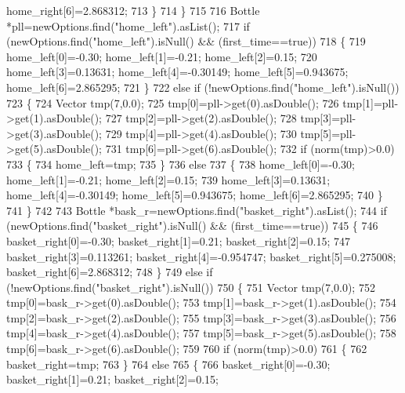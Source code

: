 \begin{DoxyCode}
      home_right[6]=2.868312;
713         \}
714     \}
715 
716     Bottle *pll=newOptions.find(\textcolor{stringliteral}{"home\_left"}).asList();
717     \textcolor{keywordflow}{if} (newOptions.find(\textcolor{stringliteral}{"home\_left"}).isNull() && (first\_time==\textcolor{keyword}{true}))
718     \{
719         home_left[0]=-0.30; home_left[1]=-0.21; home_left[2]=0.15;
720         home_left[3]=0.13631; home_left[4]=-0.30149; home_left[5]=0.943675; 
      home_left[6]=2.865295;
721     \}
722     \textcolor{keywordflow}{else} \textcolor{keywordflow}{if} (!newOptions.find(\textcolor{stringliteral}{"home\_left"}).isNull())
723     \{
724         Vector tmp(7,0.0);
725         tmp[0]=pll->get(0).asDouble();
726         tmp[1]=pll->get(1).asDouble();
727         tmp[2]=pll->get(2).asDouble();
728         tmp[3]=pll->get(3).asDouble();
729         tmp[4]=pll->get(4).asDouble();
730         tmp[5]=pll->get(5).asDouble();
731         tmp[6]=pll->get(6).asDouble();
732         \textcolor{keywordflow}{if} (norm(tmp)>0.0)
733         \{
734             home_left=tmp;
735         \}
736         \textcolor{keywordflow}{else}
737         \{
738             home_left[0]=-0.30; home_left[1]=-0.21; home_left[2]=0.15;
739             home_left[3]=0.13631; home_left[4]=-0.30149; home_left[5]=0.943675; 
      home_left[6]=2.865295;
740         \}
741     \}
742 
743     Bottle *bask\_r=newOptions.find(\textcolor{stringliteral}{"basket\_right"}).asList();
744     \textcolor{keywordflow}{if} (newOptions.find(\textcolor{stringliteral}{"basket\_right"}).isNull() && (first\_time==\textcolor{keyword}{true}))
745     \{
746         basket_right[0]=-0.30; basket_right[1]=0.21; basket_right[2]=0.15;
747         basket_right[3]=0.113261; basket_right[4]=-0.954747; basket_right[5]=0.275008; 
      basket_right[6]=2.868312;
748     \}
749     \textcolor{keywordflow}{else} \textcolor{keywordflow}{if} (!newOptions.find(\textcolor{stringliteral}{"basket\_right"}).isNull())
750     \{
751         Vector tmp(7,0.0);
752         tmp[0]=bask\_r->get(0).asDouble();
753         tmp[1]=bask\_r->get(1).asDouble();
754         tmp[2]=bask\_r->get(2).asDouble();
755         tmp[3]=bask\_r->get(3).asDouble();
756         tmp[4]=bask\_r->get(4).asDouble();
757         tmp[5]=bask\_r->get(5).asDouble();
758         tmp[6]=bask\_r->get(6).asDouble();
759 
760         \textcolor{keywordflow}{if} (norm(tmp)>0.0)
761         \{
762             basket_right=tmp;
763         \}
764         \textcolor{keywordflow}{else}
765         \{
766             basket_right[0]=-0.30; basket_right[1]=0.21; basket_right[2]=0.15;

\end{DoxyCode}
